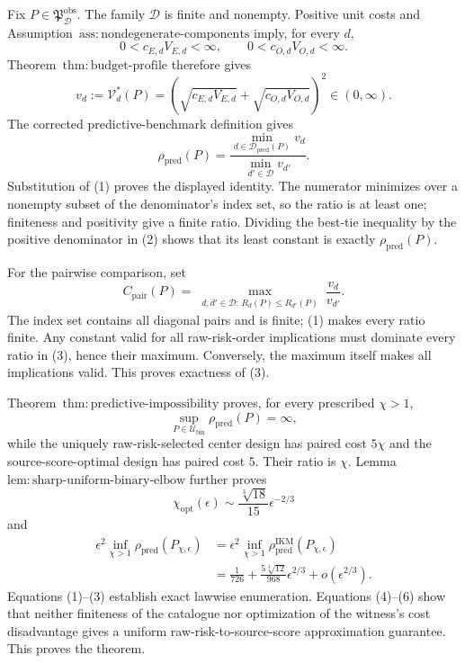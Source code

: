 Fix \(P\in\mathfrak P_{\mathcal D}^{\mathrm{obs}}\). The family \(\mathcal D\) is finite and nonempty. Positive unit costs and Assumption~\(\mathrm{ass{:}nondegenerate\text{-}components}\) imply, for every \(d\),
\[
 0<c_{E,d}V_{E,d}<\infty,
 \qquad 0<c_{O,d}V_{O,d}<\infty.
\]
Theorem~\(\mathrm{thm{:}budget\text{-}profile}\) therefore gives
\[
 v_d:=\mathcal V_d^*(P)
 =(\sqrt{c_{E,d}V_{E,d}}+\sqrt{c_{O,d}V_{O,d}})^2\in(0,\infty). \tag{1}
\]
The corrected predictive-benchmark definition gives
\[
 \rho_{\mathrm{pred}}(P)
 =\frac{\min_{d\in\mathcal D_{\mathrm{pred}}(P)}v_d}
 {\min_{d'\in\mathcal D}v_{d'}}. \tag{2}
\]
Substitution of (1) proves the displayed identity. The numerator minimizes over a nonempty subset of the denominator's index set, so the ratio is at least one; finiteness and positivity give a finite ratio. Dividing the best-tie inequality by the positive denominator in (2) shows that its least constant is exactly \(\rho_{\mathrm{pred}}(P)\).

For the pairwise comparison, set
\[
 C_{\mathrm{pair}}(P)
 =\max_{\substack{d,d'\in\mathcal D:\,R_d(P)\le R_{d'}(P)}}
 \frac{v_d}{v_{d'}}. \tag{3}
\]
The index set contains all diagonal pairs and is finite; (1) makes every ratio finite. Any constant valid for all raw-risk-order implications must dominate every ratio in (3), hence their maximum. Conversely, the maximum itself makes all implications valid. This proves exactness of (3).

Theorem~\(\mathrm{thm{:}predictive\text{-}impossibility}\) proves, for every prescribed \(\chi>1\),
\[
 \sup_{P\in\mathcal U_{\mathrm{bin}}}\rho_{\mathrm{pred}}(P)=\infty, \tag{4}
\]
while the uniquely raw-risk-selected center design has paired cost \(5\chi\) and the source-score-optimal design has paired cost \(5\). Their ratio is \(\chi\). Lemma~\(\mathrm{lem{:}sharp\text{-}uniform\text{-}binary\text{-}elbow}\) further proves
\[
 \chi_{\mathrm{opt}}(\epsilon)
 \sim\frac{\sqrt[3]{18}}{15}\epsilon^{-2/3} \tag{5}
\]
and
\[
\begin{aligned}
 \epsilon^2\inf_{\chi>1}\rho_{\mathrm{pred}}(P_{\chi,\epsilon})
 &=\epsilon^2\inf_{\chi>1}\rho_{\mathrm{pred}}^{\mathrm{IKM}}(P_{\chi,\epsilon})\\
 &=\frac1{726}+\frac{5\sqrt[3]{12}}{968}\epsilon^{2/3}+o(\epsilon^{2/3}). \tag{6}
\end{aligned}
\]
Equations (1)--(3) establish exact lawwise enumeration. Equations (4)--(6) show that neither finiteness of the catalogue nor optimization of the witness's cost disadvantage gives a uniform raw-risk-to-source-score approximation guarantee. This proves the theorem.